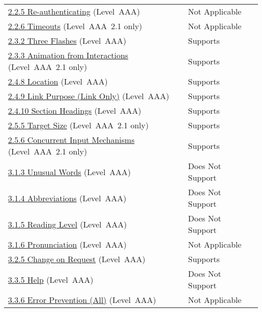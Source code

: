 \documentclass{report}
\begin{document}
\begin{longtable}{p{}<{\RaggedRight}p{}<{\RaggedRight}p{}<{\RaggedRight}}
  \href{http://www.w3.org/TR/WCAG20/#time-limits-server-timeout}{2.2.5
  Re-authenticating} (Level~AAA) & Not Applicable \\
  \href{https://www.w3.org/TR/WCAG21/#timeouts}{2.2.6 Timeouts}
  (Level~AAA~2.1 only) & Not Applicable\\
  \href{http://www.w3.org/TR/WCAG20/#seizure-three-times}{2.3.2 Three
  Flashes} (Level~AAA) & Supports\\
  \href{https://www.w3.org/TR/WCAG21/#animation-from-interactions}{2.3.3
  Animation from Interactions} (Level~AAA~2.1 only) & Supports\\
  \href{http://www.w3.org/TR/WCAG20/#navigation-mechanisms-location}{2.4.8
  Location} (Level~AAA) & Supports\\
  \href{http://www.w3.org/TR/WCAG20/#navigation-mechanisms-link}{2.4.9
  Link Purpose (Link Only)} (Level~AAA) & Supports\\
  \href{http://www.w3.org/TR/WCAG20/#navigation-mechanisms-headings}{2.4.10
  Section Headings} (Level~AAA) & Supports\\
  \href{https://www.w3.org/TR/WCAG21/#target-size}{2.5.5 Target Size}
  (Level~AAA~2.1 only) & Supports\\
  \href{https://www.w3.org/TR/WCAG21/#concurrent-input-mechanisms}{2.5.6
  Concurrent Input Mechanisms} (Level~AAA~2.1 only) & Supports\\
  \href{http://www.w3.org/TR/WCAG20/#meaning-idioms}{3.1.3 Unusual
  Words} (Level~AAA) & Does Not Support\\
  \href{http://www.w3.org/TR/WCAG20/#meaning-located}{3.1.4
  Abbreviations} (Level~AAA) & Does Not Support\\
  \href{http://www.w3.org/TR/WCAG20/#meaning-supplements}{3.1.5
  Reading Level} (Level~AAA) & Does Not Support\\
  \href{http://www.w3.org/TR/WCAG20/#meaning-pronunciation}{3.1.6
  Pronunciation} (Level~AAA) & Not Applicable\\
  \href{http://www.w3.org/TR/WCAG20/#consistent-behavior-no-extreme-changes-context}{3.2.5
  Change on Request} (Level~AAA) & Supports \\
  \href{http://www.w3.org/TR/WCAG20/#minimize-error-context-help}{3.3.5
  Help} (Level~AAA) & Does Not Support\\
  \href{http://www.w3.org/TR/WCAG20/#minimize-error-reversible-all}{3.3.6
  Error Prevention (All)} (Level~AAA) & Not Applicable\\
\end{longtable}
\end{document}

